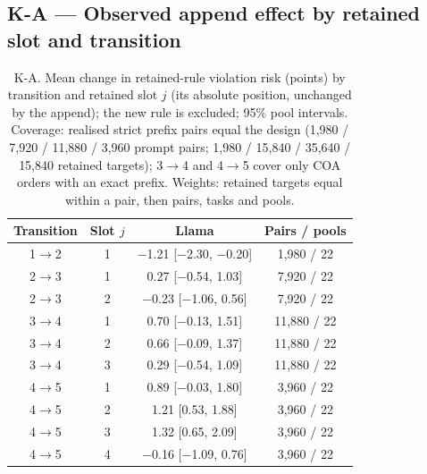 \subsection*{K-A --- Observed append effect by retained slot and transition}
\begin{table}[h]
\centering\scriptsize
\caption{K-A. Mean change in retained-rule violation risk (points) by transition and retained slot $j$ (its absolute position, unchanged by the append); the new rule is excluded; 95\% pool intervals. Coverage: realised strict prefix pairs equal the design (1,980 / 7,920 / 11,880 / 3,960 prompt pairs; 1,980 / 15,840 / 35,640 / 15,840 retained targets); 3$\to$4 and 4$\to$5 cover only COA orders with an exact prefix. Weights: retained targets equal within a pair, then pairs, tasks and pools.}
\label{tab:KA}
\begin{tabular}{cccc}
\toprule
Transition & Slot $j$ & Llama & Pairs / pools \\
\midrule
1$\to$2 & 1 & $-$1.21 [$-$2.30, $-$0.20] & 1,980 / 22 \\
2$\to$3 & 1 & 0.27 [$-$0.54, 1.03] & 7,920 / 22 \\
2$\to$3 & 2 & $-$0.23 [$-$1.06, 0.56] & 7,920 / 22 \\
3$\to$4 & 1 & 0.70 [$-$0.13, 1.51] & 11,880 / 22 \\
3$\to$4 & 2 & 0.66 [$-$0.09, 1.37] & 11,880 / 22 \\
3$\to$4 & 3 & 0.29 [$-$0.54, 1.09] & 11,880 / 22 \\
4$\to$5 & 1 & 0.89 [$-$0.03, 1.80] & 3,960 / 22 \\
4$\to$5 & 2 & 1.21 [0.53, 1.88] & 3,960 / 22 \\
4$\to$5 & 3 & 1.32 [0.65, 2.09] & 3,960 / 22 \\
4$\to$5 & 4 & $-$0.16 [$-$1.09, 0.76] & 3,960 / 22 \\
\bottomrule
\end{tabular}
\end{table}

